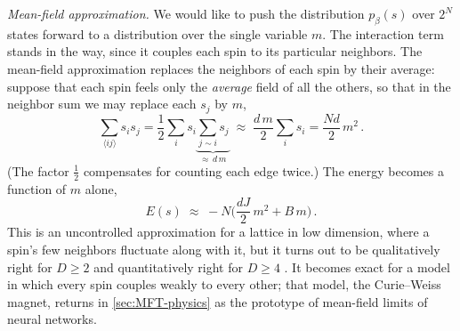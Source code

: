 \documentclass[11pt]{article}
\begin{document}
\emph{Mean-field approximation.} We would like to push the distribution $p_\beta(s)$ over $2^N$ states forward to a distribution over the single variable $m$. The interaction term stands in the way, since it couples each spin to its particular neighbors. The mean-field approximation replaces the neighbors of each spin by their average: suppose that each spin feels only the \emph{average} field of all the others, so that in the neighbor sum we may replace each $s_j$ by $m$,
%
\begin{equation}
    \sum_{\langle ij\rangle} s_i s_j = \frac{1}{2}\sum_i s_i \underbrace{\sum_{j\sim i} s_j}_{\approx\, d\,m} \;\approx\; \frac{d\,m}{2}\sum_i s_i = \frac{N d}{2}\,m^2\,.
\end{equation}
%
(The factor $\frac{1}{2}$ compensates for counting each edge twice.) The energy becomes a function of $m$ alone,
%
\begin{equation}
    E(s) \;\approx\; -N\Big(\frac{dJ}{2}\,m^2 + B\,m\Big)\,. \label{ising-E-mf}
\end{equation}
%
This is an uncontrolled approximation for a lattice in low dimension, where a spin's few neighbors fluctuate along with it, but it turns out to be qualitatively right for $D\geq 2$ and quantitatively right for $D\geq 4$ \cite[Chapter 1]{TongSFT}. It becomes exact for a model in which every spin couples weakly to every other; that model, the Curie--Weiss magnet, returns in \cref{sec:MFT-physics} as the prototype of mean-field limits of neural networks.
\end{document}
